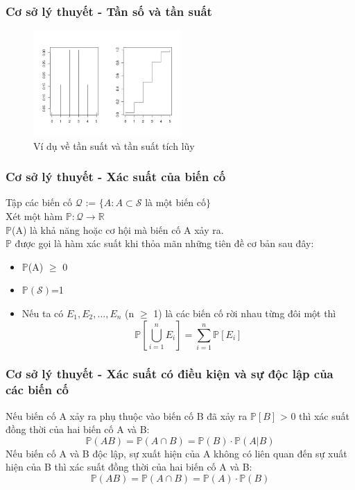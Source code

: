 \documentclass[t]{beamer}
\begin{document}
\begin{frame}[t]
\frametitle{Cơ sở lý thuyết - Tần số và tần suất}
\begin{figure}[h]
  \centering
    \includegraphics[width=0.5\textwidth]{TanSoVaTanSuat.png}   
    \caption*{Ví dụ về tần suất và tần suất tích lũy} 
\end{figure}
\end{frame}


\begin{frame}[t]
\frametitle{Cơ sở lý thuyết - Xác suất của biến cố}
Tập các biến cố $\mathcal{Q}$ := $\{ A: A \subset \mathcal{S}$ là một biến cố$\}$\\
Xét một hàm $\mathbb{P}: \mathcal{Q} \rightarrow \mathbb{R}$\\
$\mathbb{P}$(A) là khả năng hoặc cơ hội mà biến cố A xảy ra.\\
$\mathbb{P}$ được gọi là hàm xác suất khi thỏa mãn những tiên đề cơ bản sau đây:\\
\begin{itemize}
\item $\mathbb{P}$(A) $\geq$ 0
\item $\mathbb{P}(\mathcal{S})$=1
\item Nếu ta có $E_{1}, E_{2},...,E_{n}$ (n $\geq$ 1) là các biến cố rời nhau từng đôi một thì\\
\[
\mathbb{P}\left[\bigcup_{i=1}^n E_{i}\right]=\sum_{i=1}^n \mathbb{P}[E_i]
\]
\end{itemize}
\end{frame}


\begin{frame}[t]
\frametitle{Cơ sở lý thuyết - Xác suất có điều kiện và sự độc lập của các biến cố}
Nếu biến cố A xảy ra phụ thuộc vào biến cố B đã xảy ra $\mathbb{P}[B]$ > 0 thì xác suất đồng thời của hai biến cố A và B:
\[
\mathbb{P}(AB)=\mathbb{P}(A\cap B)=\mathbb{P}(B)\cdot \mathbb{P}(A|B)
\]
Nếu biến cố A và B độc lập, sự xuất hiện của A không có liên quan đến sự xuất hiện của B thì xác suất đồng thời của hai biến cố A và B:
\[
\mathbb{P}(AB)=\mathbb{P}(A\cap B)=\mathbb{P}(A)\cdot\mathbb{P}(B)
\]
\end{frame}
\end{document}
